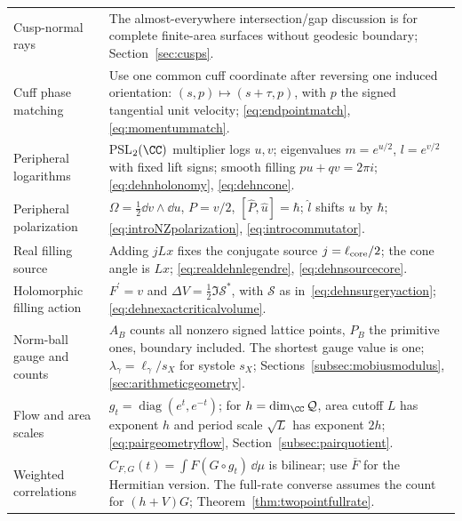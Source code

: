 \begin{longtable}{@{}>{\raggedright\arraybackslash}p{}
 >{\raggedright\arraybackslash}p{}@{}}
Cusp-normal rays & The almost-everywhere intersection/gap discussion is for complete finite-area surfaces without geodesic boundary; Section~\ref{sec:cusps}.\\
Cuff phase matching & Use one common cuff coordinate after reversing one induced orientation: $(s,p)\mapsto(s+\tau,p)$, with $p$ the signed tangential unit velocity; \eqref{eq:endpointmatch}, \eqref{eq:momentummatch}.\\
Peripheral logarithms & PSL$_2(\CC)$ multiplier logs $u,v$; eigenvalues $m=e^{u/2}$, $l=e^{v/2}$ with fixed lift signs; smooth filling $pu+qv=2\pi i$; \eqref{eq:dehnholonomy}, \eqref{eq:dehncone}.\\
Peripheral polarization & $\Omega=\frac12\dd v\wedge\dd u$, $P=v/2$, $[\widehat P,\widehat u]=\hbar$; $\widehat l$ shifts $u$ by $\hbar$; \eqref{eq:introNZpolarization}, \eqref{eq:introcommutator}.\\
Real filling source & Adding $jLx$ fixes the conjugate source $j=\ell_{\rm core}/2$; the cone angle is $Lx$; \eqref{eq:realdehnlegendre}, \eqref{eq:dehnsourcecore}.\\
Holomorphic filling action & $F^{\prime}=v$ and $\Delta V=\frac12\Im\mathcal S^*$, with $\mathcal S$ as in~\eqref{eq:dehnsurgeryaction}; \eqref{eq:dehnexactcriticalvolume}.\\
Norm-ball gauge and counts & $A_B$ counts all nonzero signed lattice points, $P_B$ the primitive ones, boundary included. The shortest gauge value is one; $\lambda_\gamma=\ell_\gamma/s_X$ for systole $s_X$; Sections~\ref{subsec:mobiusmodulus}, \ref{sec:arithmeticgeometry}.\\
Flow and area scales & $g_t=\operatorname{diag}(e^t,e^{-t})$; for $h=\dim_{\CC}\mathcal Q$, area cutoff $L$ has exponent $h$ and period scale $\sqrt L$ has exponent $2h$; \eqref{eq:pairgeometryflow}, Section~\ref{subsec:pairquotient}.\\
Weighted correlations & $C_{F,G}(t)=\int F(G\circ g_t)\,\dd\mu$ is bilinear; use $\overline F$ for the Hermitian version. The full-rate converse assumes the count for $(h+V)G$; Theorem~\ref{thm:twopointfullrate}.\\
\bottomrule
\end{longtable}
\endgroup

